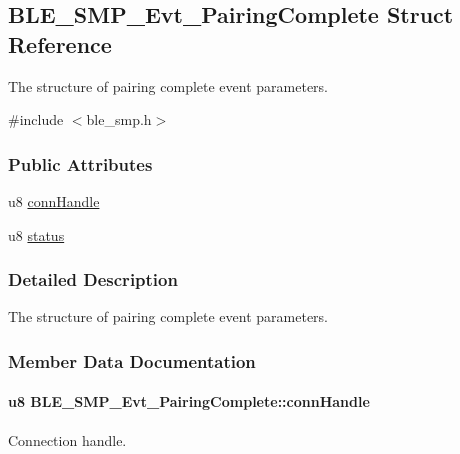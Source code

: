 \hypertarget{struct_b_l_e___s_m_p___evt___pairing_complete}{}\subsection{B\+L\+E\+\_\+\+S\+M\+P\+\_\+\+Evt\+\_\+\+Pairing\+Complete Struct Reference}
\label{struct_b_l_e___s_m_p___evt___pairing_complete}


The structure of pairing complete event parameters.  




{\ttfamily \#include $<$ble\+\_\+smp.\+h$>$}

\subsubsection*{Public Attributes}
\begin{DoxyCompactItemize}
\item 
u8 \hyperlink{struct_b_l_e___s_m_p___evt___pairing_complete_a9f6d1e8bb31f234e2dd2f77ea2fd6027}{conn\+Handle}
\item 
u8 \hyperlink{struct_b_l_e___s_m_p___evt___pairing_complete_a25a4d48871960c99a4693dee0fa598d8}{status}
\end{DoxyCompactItemize}


\subsubsection{Detailed Description}
The structure of pairing complete event parameters. 

\subsubsection{Member Data Documentation}
\paragraph[{\texorpdfstring{conn\+Handle}{connHandle}}]{\setlength{\rightskip}{0pt plus 5cm}u8 B\+L\+E\+\_\+\+S\+M\+P\+\_\+\+Evt\+\_\+\+Pairing\+Complete\+::conn\+Handle}\hypertarget{struct_b_l_e___s_m_p___evt___pairing_complete_a9f6d1e8bb31f234e2dd2f77ea2fd6027}{}\label{struct_b_l_e___s_m_p___evt___pairing_complete_a9f6d1e8bb31f234e2dd2f77ea2fd6027}
Connection handle. 
